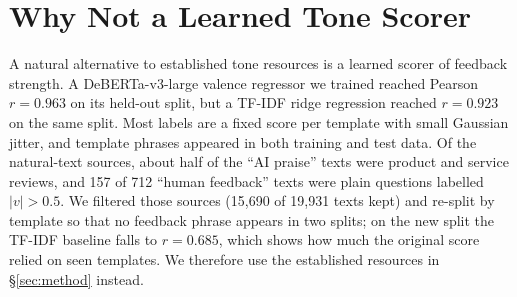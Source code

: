 \section{Why Not a Learned Tone Scorer}
\label{app:scorer}

A natural alternative to established tone resources is a learned scorer of feedback strength.
A DeBERTa-v3-large valence regressor we trained reached Pearson $r = 0.963$ on its held-out split, but a TF-IDF ridge regression reached $r = 0.923$ on the same split.
Most labels are a fixed score per template with small Gaussian jitter, and template phrases appeared in both training and test data.
Of the natural-text sources, about half of the ``AI praise'' texts were product and service reviews, and 157 of 712 ``human feedback'' texts were plain questions labelled $|v| > 0.5$.
We filtered those sources (15{,}690 of 19{,}931 texts kept) and re-split by template so that no feedback phrase appears in two splits; on the new split the TF-IDF baseline falls to $r = 0.685$, which shows how much the original score relied on seen templates.
We therefore use the established resources in \S\ref{sec:method} instead.
